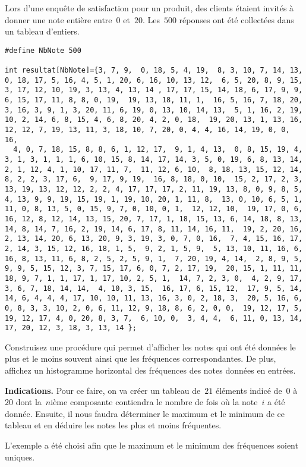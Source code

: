 \begin{exercice}
  Lors d'une  enqu\^ete de satisfaction pour  un produit,  des clients
  \'etaient invit\'es \`a donner une note enti\`ere entre~$0$ et~$20$.
  Les~$500$    r\'eponses ont  \'et\'e    collect\'ees dans un tableau
  d'entiers.
\begin{verbatim}
#define NbNote 500

int resultat[NbNote]={3, 7, 9,  0, 18, 5, 4, 19,  8, 3, 10, 7, 14, 13,
0, 18, 17, 5, 16, 4, 5, 1, 20, 6, 16, 10, 13, 12,  6, 5, 20, 8, 9, 15,
3, 17, 12, 10, 19, 3, 13, 4, 13, 14 , 17, 17, 15, 14, 18, 6, 17, 9, 9,
6, 15, 17, 11, 8, 8, 0, 19,  19, 13, 18, 11, 1,  16, 5, 16, 7, 18, 20,
3, 16, 3, 9, 1, 3, 20, 11, 6, 19, 0, 13, 10, 14, 13,  5, 1, 16, 2, 19,
10, 2, 14, 6, 8, 15, 4, 6, 8, 20, 4, 2, 0, 18,  19, 20, 13, 1, 13, 16,
12, 12, 7, 19, 13, 11, 3, 18, 10, 7, 20, 0, 4, 4, 16, 14, 19, 0, 0, 16,
  4, 0, 7, 18, 15, 8, 8, 6, 1, 12, 17,  9, 1, 4, 13,  0, 8, 15, 19, 4,
3, 1, 3, 1, 1, 1, 6, 10, 15, 8, 14, 17, 14, 3, 5, 0, 19, 6, 8, 13, 14,
2, 1, 12, 4, 1, 10, 17, 11, 7,  11, 12, 6, 10,  8, 18, 13, 15, 12, 14,
8, 2, 2, 3, 17, 6,  9, 17, 9, 19,  16, 8, 18, 0, 10,  15, 2, 17, 2, 3,
13, 19, 13, 12, 12, 2, 2, 4, 17, 17, 17, 2, 11, 19, 13, 8, 0, 9, 8, 5,
4, 13, 9, 9, 19, 15, 19, 1, 19, 10, 20, 1, 11, 8,  13, 0, 10, 6, 5, 1,
11, 0, 8, 13, 5, 0, 15, 9, 7, 0, 10, 0, 1,  12, 12, 10,  19, 17, 0, 6,
16, 12, 8, 12, 14, 13, 15, 20, 7, 17, 1, 18, 15, 13, 6, 14, 18, 8, 13,
14, 8, 14, 7, 16, 2, 19, 14, 6, 17, 8, 11, 14, 16, 11,  19, 2, 20, 16,
2, 13, 14, 20, 6, 13, 20, 9, 3, 19, 3, 0, 7, 0, 16,  7, 4, 15, 16, 17,
2, 14, 3, 15, 12, 16, 18, 1, 5,  9, 2, 1, 5, 9,  5, 13, 10, 11, 16, 6,
16, 8, 13, 11, 6, 8, 2, 5, 2, 5, 9, 1,  7, 20, 19, 4, 14,  2, 8, 9, 5,
9, 9, 5, 15, 12, 3, 7, 15, 17, 6, 0, 7, 2, 17, 19,  20, 15, 1, 11, 11,
18, 9, 7, 1, 1, 17, 1, 17, 10, 2, 5, 1,  14, 7, 2, 3, 0,  4, 2, 9, 17,
3, 6, 7, 18, 14, 14,  4, 10, 3, 15,  16, 17, 6, 15, 12,  17, 9, 5, 14,
14, 6, 4, 4, 4, 17, 10, 10, 11, 13, 16, 3, 0, 2, 18, 3,  20, 5, 16, 6,
0, 8, 3, 3, 10, 2, 0, 6, 11, 12, 9, 18, 8, 6, 2, 0, 0,  19, 12, 17, 5,
19, 12, 17, 4, 0, 20, 8, 3, 7,  6, 10, 0,  3, 4, 4,  6, 11, 0, 13, 14,
17, 20, 12, 3, 18, 3, 13, 14 };
\end{verbatim}
  Construisez une proc\'edure qui  permet d'afficher les notes qui  ont
  \'et\'e donn\'ees  le  plus et   le   moins souvent ainsi  que   les
  fr\'equences  correspondantes.    De plus, affichez   un histogramme
  horizontal des fr\'equences des notes donn\'ees en entr\'ees.
  \par
  \textbf{Indications.} Pour ce   faire,   on va cr\'eer    un tableau
  de~$21$  \'el\'ements  indic\'e  de~$0$   \`a~$20$ dont la~$n$i\`eme
  composante contiendra  le nombre de fois  o\`u la note~$i$ a \'et\'e
  donn\'ee.  Ensuite,  il  nous faudra d\'eterminer  le  maximum et le
  minimum de ce tableau  et en d\'eduire les notes  les plus et  moins
  fr\'equentes.
  \par
  L'exemple  a \'et\'e choisi  afin que le  maximum  et le minimum des
  fr\'equences soient uniques.
  \ifcorrection
  \begin{correction}
    
  \end{correction}
  \fi
\end{exercice}
